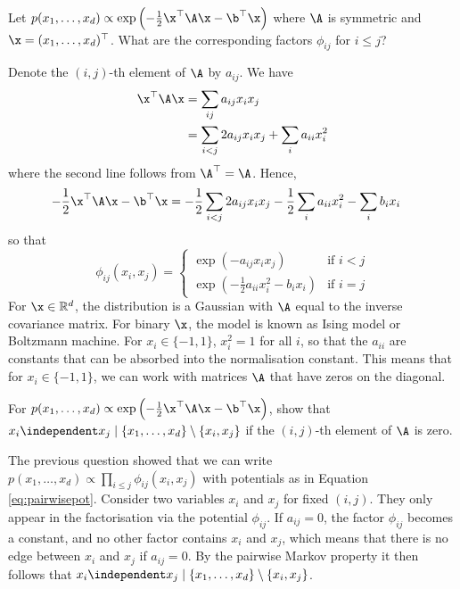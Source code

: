\begin{exenumerate} 
  
\item Let $p(x_1, \ldots, x_d) \propto \exp\left( -\frac{1}{2} \x^\top
  \A \x - \b^\top \x \right)$ where $\A$ is symmetric and $\x = (x_1,
  \ldots, x_d)^\top$. What are the corresponding factors $\phi_{ij}$
  for $i\le j$?
  \begin{solution}
    Denote the $(i,j)$-th element of $\A$ by $a_{ij}$. We have
    \begin{align}
      \x^\top \A \x & = \sum_{ij} a_{ij} x_i x_j \\
      &= \sum_{i<j} 2 a_{ij} x_i x_j + \sum_i a_{ii} x_i^2
    \end{align}
    where the second line follows from $\A^\top =\A$. Hence,
    \begin{align}
      -\frac{1}{2} \x^\top \A \x - \b^\top \x & = -\frac{1}{2} \sum_{i<j} 2a_{ij} x_i x_j - \frac{1}{2} \sum_i a_{ii} x_i^2 - \sum_i b_i x_i
    \end{align}
    so that
\begin{equation}
      \phi_{ij}(x_i,x_j) = \begin{cases}
        \exp\left(- a_{ij} x_i x_j\right) & \text{if } i < j\\
        \exp\left( - \frac{1}{2} a_{ii} x_i^2 - b_i x_i\right) & \text{if } i=j
      \end{cases}
      \label{eq:pairwisepot}
\end{equation}
For $\x \in \mathbb{R}^d$, the distribution is a Gaussian with $\A$
equal to the inverse covariance matrix. For binary $\x$, the model is
known as Ising model or Boltzmann machine. For $x_i \in \{-1,1\}$,
$x_i^2=1$ for all $i$, so that the $a_{ii}$ are constants
that can be absorbed into the normalisation constant. This means that
for $x_i \in \{-1,1\}$, we can work with matrices $\A$ that have zeros
on the diagonal.

  \end{solution}

\item For $p(x_1, \ldots, x_d) \propto \exp\left( -\frac{1}{2} \x^\top
  \A \x - \b^\top \x \right)$, show that $x_i \independent x_j \mid
  \{x_1, \ldots, x_d\} \setminus \{x_i,x_j\}$ if the $(i,j)$-th
  element of $\A$ is zero.

  \begin{solution}

    The previous question showed that we can write $p(x_1, \ldots,
    x_d) \propto \prod_{i \leq j} \phi_{ij}(x_i,x_j)$ with potentials as in
    Equation \eqref{eq:pairwisepot}.  Consider two variables $x_i$ and
    $x_j$ for fixed $(i,j)$. They only appear in the factorisation via
    the potential $\phi_{ij}$. If $a_{ij} = 0$, the factor $\phi_{ij}$
    becomes a constant, and no other factor contains $x_i$ and $x_j$,
    which means that there is no edge between $x_i$ and $x_j$ if
    $a_{ij}=0$. By the pairwise Markov property it then follows that
    $x_i \independent x_j \mid \{x_1, \ldots, x_d\} \setminus \{x_i,x_j\}$.

  \end{solution}
  
\end{exenumerate}

